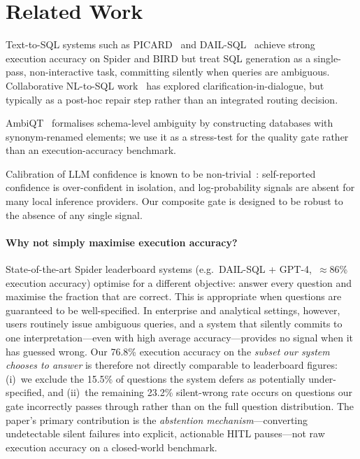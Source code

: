 \documentclass{article}
\begin{document}
\section{Related Work}
\label{sec:related}

Text-to-SQL systems such as PICARD~\citep{picard} and DAIL-SQL~\citep{dailsql}
achieve strong execution accuracy on Spider and BIRD but treat SQL generation
as a single-pass, non-interactive task, committing silently when queries are
ambiguous.
Collaborative NL-to-SQL work~\citep{nl2sql_clarify} has explored
clarification-in-dialogue, but typically as a post-hoc repair step rather
than an integrated routing decision.

AmbiQT~\citep{ambiqt} formalises schema-level ambiguity by constructing
databases with synonym-renamed elements; we use it as a stress-test for the
quality gate rather than an execution-accuracy benchmark.

Calibration of LLM confidence is known to be non-trivial~\citep{calibration_llm}:
self-reported confidence is over-confident in isolation, and log-probability
signals are absent for many local inference providers.
Our composite gate is designed to be robust to the absence of any single signal.

\paragraph{Why not simply maximise execution accuracy?}
State-of-the-art Spider leaderboard systems (e.g.\
DAIL-SQL + GPT-4,~$\approx$86\% execution accuracy) optimise for a different
objective: answer every question and maximise the fraction that are correct.
This is appropriate when questions are guaranteed to be well-specified.
In enterprise and analytical settings, however, users routinely issue ambiguous
queries, and a system that silently commits to one interpretation---even with
high average accuracy---provides no signal when it has guessed wrong.
Our 76.8\% execution accuracy on the \emph{subset our system chooses to answer}
is therefore not directly comparable to leaderboard figures: (i)~we exclude the
15.5\% of questions the system defers as potentially under-specified, and
(ii)~the remaining 23.2\% silent-wrong rate occurs on questions our gate
incorrectly passes through rather than on the full question distribution.
The paper's primary contribution is the \emph{abstention mechanism}---converting
undetectable silent failures into explicit, actionable HITL pauses---not
raw execution accuracy on a closed-world benchmark.
\end{document}
